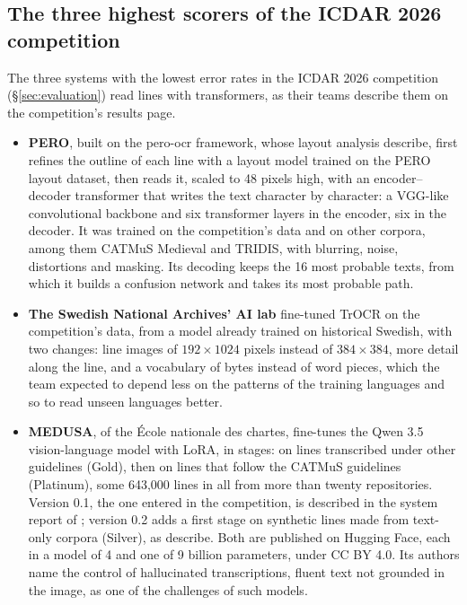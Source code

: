 \subsection{The three highest scorers of the ICDAR 2026 competition}
The three systems with the lowest error rates in the ICDAR 2026 competition (\S\ref{sec:evaluation}) read lines with
transformers, as their teams describe them on the competition's results page.
\begin{itemize}
  \item \textbf{PERO}, built on the pero-ocr framework, whose layout analysis 
    describe, first refines the outline of each line with a layout model trained on the PERO layout dataset, then reads it, scaled to 48 pixels high, with an
    encoder--decoder transformer that writes the text character by character: a VGG-like convolutional backbone and six
    transformer layers in the encoder, six in the decoder. It was trained on the competition's data and on other
    corpora, among them CATMuS Medieval and TRIDIS, with blurring, noise, distortions and masking. Its decoding keeps
    the 16 most probable texts, from which it builds a confusion network and takes its most probable path.
  \item \textbf{The Swedish National Archives' AI lab} fine-tuned TrOCR on the competition's data, from a model already
    trained on historical Swedish, with two changes: line images of $192 \times 1024$ pixels instead of
    $384 \times 384$, more detail along the line, and a vocabulary of bytes instead of word pieces, which the team
    expected to depend less on the patterns of the training languages and so to read unseen languages better.
  \item \textbf{MEDUSA}, of the École nationale des chartes, fine-tunes the Qwen 3.5 vision-language model with LoRA,
    in stages: on lines transcribed under other guidelines (Gold), then on lines that follow the CATMuS guidelines
    (Platinum), some 643,000 lines in all from more than twenty repositories. Version 0.1, the one entered in the
    competition, is described in the system report of ; version
    0.2 adds a first stage on synthetic lines made from text-only corpora (Silver), as
     describe. Both are published on Hugging Face, each in a model
    of 4 and one of 9 billion parameters, under CC BY 4.0. Its authors name the control of hallucinated
    transcriptions, fluent text not grounded in the image, as one of the challenges of such models.
\end{itemize}

